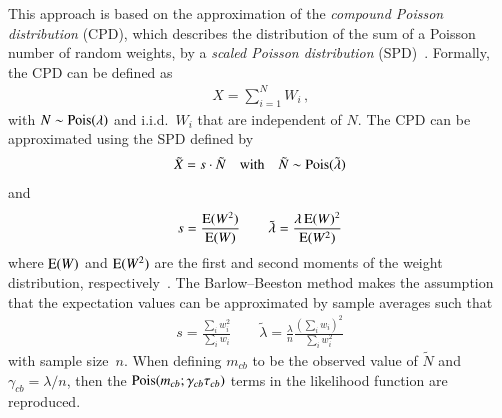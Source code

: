 This approach is based on the approximation of the \emph{compound Poisson
  distribution} (CPD), which describes the distribution of the sum of a Poisson
number of random weights, by a \emph{scaled Poisson distribution}
(SPD)~\cite{Bohm:2013gla}. Formally, the CPD can be defined as
\begin{align*}
  X = \sum_{i = 1}^{N} W_i \,\text{,}  %
\end{align*}
with $N \sim \operatorname{Pois}(\lambda)$ and i.i.d.\ $W_i$ that are independent of $N$. The
CPD can be approximated using the SPD defined by
\begin{align*}
  \tilde{X} = s \cdot \tilde{N} \quad \text{with} \quad \tilde{N} \sim \operatorname{Pois}(\tilde{\lambda})
\end{align*}
and
\begin{align*}
  s = \frac{\operatorname{E}(W^2)}{\operatorname{E}(W)} \qquad \tilde{\lambda} = \frac{\lambda \operatorname{E}(W)^2}{\operatorname{E}(W^2)}
\end{align*}
where $\operatorname{E}(W)$ and $\operatorname{E}(W^2)$ are the first and second moments of the
weight distribution, respectively~\cite{Bohm:2013gla}. The Barlow--Beeston
method makes the assumption that the expectation values can be approximated by
sample averages such that
\begin{align*}
  s = \frac{\sum_i w_i^2}{\sum_i w_i} \qquad \tilde{\lambda} = \frac{\lambda}{n} \frac{(\sum_i w_i)^2}{\sum_i w_i^2}
\end{align*}
with sample size~$n$. When defining $m_{cb}$ to be the observed value of
$\tilde{N}$ and $\gamma_{cb} = \lambda / n$, then the
$\operatorname{Pois}(m_{cb}; \gamma_{cb} \tau_{cb})$ terms in the likelihood function are
reproduced.



